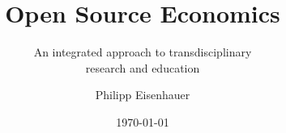 
\title{Open Source Economics}
\subtitle{An integrated approach to transdisciplinary \\ research and education}
\author{Philipp Eisenhauer}
\date{\today}

\begin{frame}[standout]{~}\titlepage\end{frame}
